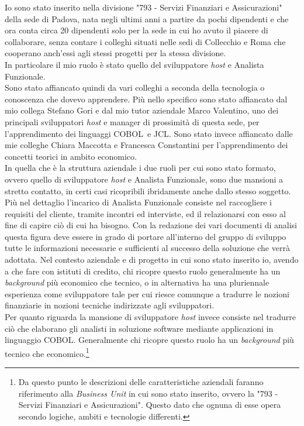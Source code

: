 Io sono stato inserito nella divisione "793 - Servizi Finanziari e Assicurazioni" della sede di Padova, nata negli ultimi anni a partire da pochi dipendenti e che ora conta circa 20 dipendenti solo per la sede in cui ho avuto il piacere di collaborare, senza contare i colleghi situati nelle sedi di Collecchio e Roma che cooperano anch'essi agli stessi progetti per la stessa divisione.\\
In particolare il mio ruolo è stato quello del sviluppatore \textit{host} e Analista Funzionale. \\
	Sono stato affiancato quindi da vari colleghi a seconda della tecnologia o conoscenza che dovevo apprendere. Più nello specifico sono stato affiancato dal mio collega Stefano Gori e dal mio tutor aziendale Marco Valentino, uno dei principali sviluppatori \textit{host} e manager di prossimità di questa sede, per l'apprendimento dei linguaggi COBOL\glossario\ e JCL\glossario. Sono stato invece affiancato dalle mie colleghe Chiara Maccotta e Francesca Constantini per l'apprendimento dei concetti teorici in ambito economico.\\ %
	
	In quella che è la struttura aziendale i due ruoli per cui sono stato formato, ovvero quello di sviluppatore \textit{host} e Analista Funzionale, sono due mansioni a stretto contatto, in certi casi ricopribili ibridamente anche dallo stesso soggetto. \\ Più nel dettaglio l'incarico di Analista Funzionale consiste nel raccogliere i requisiti del cliente, tramite incontri ed interviste, ed il relazionarsi con esso al fine di capire ciò di cui ha bisogno. Con la redazione dei vari documenti di analisi questa figura deve essere in grado di portare all'interno del gruppo di sviluppo tutte le informazioni necessarie e sufficienti al successo della soluzione che verrà adottata. Nel contesto aziendale e di progetto in cui sono stato inserito io, avendo a che fare con istituti di credito, chi ricopre questo ruolo generalmente ha un \textit{background} più economico che tecnico, o in alternativa ha una pluriennale esperienza come sviluppatore tale per cui riesce comunque a tradurre le nozioni finanziarie in nozioni tecniche indirizzate agli sviluppatori. \\ Per quanto riguarda la mansione di sviluppatore \textit{host} invece consiste nel tradurre ciò che elaborano gli analisti in soluzione software mediante applicazioni in linguaggio COBOL. Generalmente chi ricopre questo ruolo ha un \textit{background} più tecnico che economico.\footnote{Da questo punto le descrizioni delle caratteristiche aziendali faranno riferimento alla \textit{Business Unit} in cui sono stato inserito, ovvero la "793 - Servizi Finanziari e Assicurazioni". Questo dato che ognuna di esse opera secondo logiche, ambiti e tecnologie differenti.}


